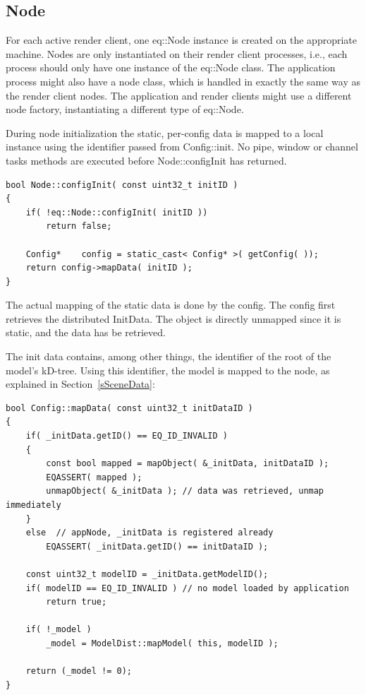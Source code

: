\documentclass[10pt,a4]{scrartcl}
\newcommand{\sref}[1]{Section~\ref{#1}}
\begin{document}
\subsection{Node}

For each active render client, one \textsf{eq::Node} instance is
created on the appropriate machine. Nodes are only instantiated on their
render client processes, i.e., each process should only have one
instance of the \textsf{eq::Node} class. The application process might
also have a node class, which is handled in exactly the same way as the
render client nodes. The application and render clients might use a
different node factory, instantiating a different type of \textsf{eq::Node}.

During node initialization the static, per-config data is mapped to a
local instance using the identifier passed from
\textsf{Config::init}. No pipe, window or channel tasks methods are
executed before \textsf{Node::configInit} has returned.

{\footnotesize\begin{lstlisting}
bool Node::configInit( const uint32_t initID )
{
    if( !eq::Node::configInit( initID ))
        return false;

    Config*    config = static_cast< Config* >( getConfig( ));
    return config->mapData( initID );
}
\end{lstlisting}}

The actual mapping of the static data is done by the config. The config
first retrieves the distributed \textsf{InitData}. The object is
directly unmapped since it is static, and the data has be retrieved.

The init data contains, among other things, the identifier of the
root of the model's kD-tree. Using this identifier, the model is mapped
to the node, as explained in \sref{sSceneData}:

{\footnotesize\begin{lstlisting}
bool Config::mapData( const uint32_t initDataID )
{
    if( _initData.getID() == EQ_ID_INVALID )
    {
        const bool mapped = mapObject( &_initData, initDataID );
        EQASSERT( mapped );
        unmapObject( &_initData ); // data was retrieved, unmap immediately
    }
    else  // appNode, _initData is registered already
        EQASSERT( _initData.getID() == initDataID );

    const uint32_t modelID = _initData.getModelID();
    if( modelID == EQ_ID_INVALID ) // no model loaded by application
        return true;

    if( !_model )
        _model = ModelDist::mapModel( this, modelID );

    return (_model != 0);
}
\end{lstlisting}}
\end{document}
